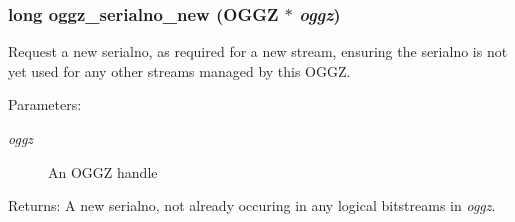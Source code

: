 \subsubsection{\setlength{\rightskip}{0pt plus 5cm}long oggz\_\-serialno\_\-new ({\bf OGGZ} $\ast$ {\em oggz})}\label{oggz_8h_a25}


Request a new serialno, as required for a new stream, ensuring the serialno is not yet used for any other streams managed by this OGGZ. 

\begin{Desc}
\item[Parameters:]
\begin{description}
\item[{\em oggz}]An OGGZ handle \end{description}
\end{Desc}
\begin{Desc}
\item[Returns:]A new serialno, not already occuring in any logical bitstreams in {\em oggz\/}. \end{Desc}
